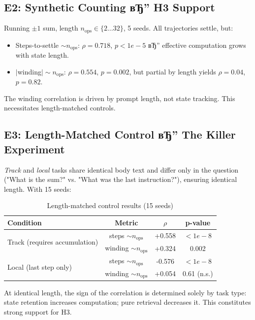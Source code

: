 \subsection{E2: Synthetic Counting вЂ” H3 Support}

Running $\pm1$ sum, length $n_{\text{ops}} \in \{2\ldots 32\}$, 5 seeds. All trajectories settle, but:

\begin{itemize}
    \item Steps-to-settle $\sim n_{\text{ops}}$: $\rho = 0.718$, $p < 1e-5$ вЂ” effective computation grows with state length.
    \item $|$winding$| \sim n_{\text{ops}}$: $\rho = 0.554$, $p = 0.002$, but partial by length yields $\rho = 0.04$, $p = 0.82$.
\end{itemize}

The winding correlation is driven by prompt length, not state tracking. This necessitates length-matched controls.

\subsection{E3: Length-Matched Control вЂ” The Killer Experiment}

\textit{Track} and \textit{local} tasks share identical body text and differ only in the question ("What is the sum?" vs. "What was the last instruction?"), ensuring identical length. With 15 seeds:

\begin{table}[h]
\centering
\caption{Length-matched control results (15 seeds)}
\begin{tabular}{lccc}
\toprule
Condition & Metric & $\rho$ & p-value \\
\midrule
\multirow{2}{*}{Track (requires accumulation)} & steps $\sim n_{\text{ops}}$ & +0.558 & $< 1e-8$ \\
 & winding $\sim n_{\text{ops}}$ & +0.324 & 0.002 \\
\multirow{2}{*}{Local (last step only)} & steps $\sim n_{\text{ops}}$ & -0.576 & $< 1e-8$ \\
 & winding $\sim n_{\text{ops}}$ & +0.054 & 0.61 (n.s.) \\
\bottomrule
\end{tabular}
\end{table}

At identical length, the sign of the correlation is determined solely by task type: state retention increases computation; pure retrieval decreases it. This constitutes strong support for H3.

